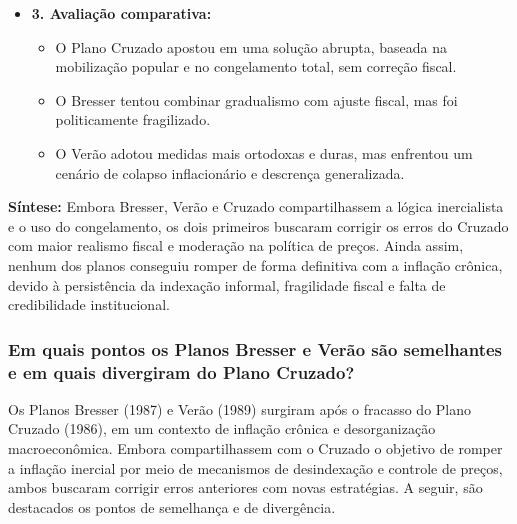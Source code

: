 \documentclass[a4paper,12pt]{article}[abntex2]
\begin{document}
\begin{itemize}
    \item \textbf{3. Avaliação comparativa:}
    \begin{itemize}
        \item O Plano Cruzado apostou em uma solução abrupta, baseada na mobilização popular e no congelamento total, sem correção fiscal.
        \item O Bresser tentou combinar gradualismo com ajuste fiscal, mas foi politicamente fragilizado.
        \item O Verão adotou medidas mais ortodoxas e duras, mas enfrentou um cenário de colapso inflacionário e descrença generalizada.
    \end{itemize}
\end{itemize}

\textbf{Síntese:} Embora Bresser, Verão e Cruzado compartilhassem a lógica inercialista e o uso do congelamento, os dois primeiros buscaram corrigir os erros do Cruzado com maior realismo fiscal e moderação na política de preços. Ainda assim, nenhum dos planos conseguiu romper de forma definitiva com a inflação crônica, devido à persistência da indexação informal, fragilidade fiscal e falta de credibilidade institucional.

\subsubsection{\textbf{Em quais pontos os Planos Bresser e Verão são semelhantes e em quais divergiram do Plano Cruzado?}}

Os Planos Bresser (1987) e Verão (1989) surgiram após o fracasso do Plano Cruzado (1986), em um contexto de inflação crônica e desorganização macroeconômica. Embora compartilhassem com o Cruzado o objetivo de romper a inflação inercial por meio de mecanismos de desindexação e controle de preços, ambos buscaram corrigir erros anteriores com novas estratégias. A seguir, são destacados os pontos de semelhança e de divergência.
\end{document}
